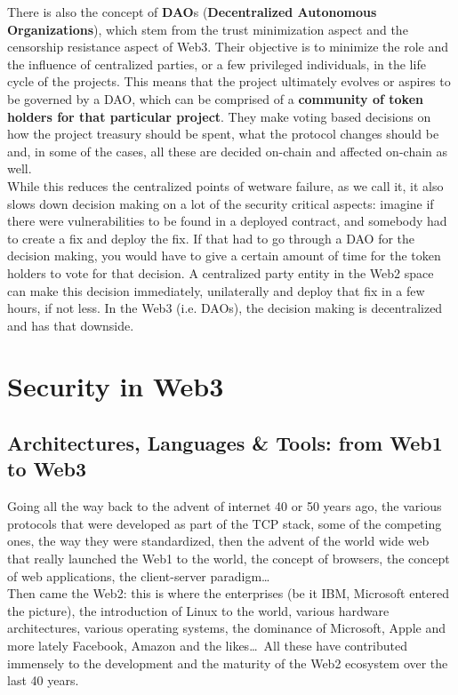 There is also the concept of \textbf{DAO}s (\textbf{Decentralized Autonomous Organizations}), which stem from the trust minimization aspect and the censorship resistance aspect of Web3.
Their objective is to minimize the role and the influence of centralized parties, or a few privileged individuals, in the life cycle of the projects.
This means that the project ultimately evolves or aspires to be governed by a DAO, which can be comprised of a \textbf{community of token holders for that particular project}.
They make voting based decisions on how the project treasury should be spent, what the protocol changes should be and, in some of the cases, all these are decided on-chain and affected on-chain as well.\\

While this reduces the centralized points of wetware failure, as we call it, it also slows down decision making on a lot of the security critical aspects: imagine if there were vulnerabilities to be found in a deployed contract, and somebody had to create a fix and deploy the fix.
If that had to go through a DAO for the decision making, you would have to give a certain amount of time for the token holders to vote for that decision.
A centralized party entity in the Web2 space can make this decision immediately, unilaterally and deploy that fix in a few hours, if not less.
In the Web3 (i.e. DAOs), the decision making is decentralized and has that downside.

\section{Security in Web3}

\subsection*{Architectures, Languages \& Tools: from Web1 to Web3}

Going all the way back to the advent of internet 40 or 50 years ago, the various protocols that were developed as part of the TCP stack, some of the competing ones, the way they were standardized, then the advent of the world wide web that really launched the Web1 to the world, the concept of browsers, the concept of web applications, the client-server paradigm\dots\\

Then came the Web2: this is where the enterprises (be it IBM, Microsoft entered the picture), the introduction of Linux to the world, various hardware architectures, various operating systems, the dominance of Microsoft, Apple and more lately Facebook, Amazon and the likes\dots\,
All these have contributed immensely to the development and the maturity of the Web2 ecosystem over the last 40 years.\\

